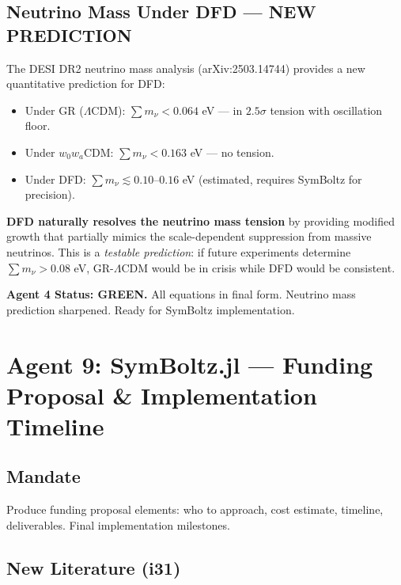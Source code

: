 \documentclass[11pt,a4paper]{article}
\newcommand{\GREEN}{\textcolor{dfdgreen}{\textbf{GREEN}}}
\begin{document}
\subsection{Neutrino Mass Under DFD --- NEW PREDICTION}

The DESI DR2 neutrino mass analysis (arXiv:2503.14744) provides a new quantitative prediction for DFD:

\begin{itemize}
\item Under GR ($\Lambda$CDM): $\sum m_\nu < 0.064$ eV --- in $2.5\sigma$ tension with oscillation floor.
\item Under $w_0w_a$CDM: $\sum m_\nu < 0.163$ eV --- no tension.
\item Under DFD: $\sum m_\nu \lesssim 0.10$--$0.16$ eV (estimated, requires SymBoltz for precision).
\end{itemize}

\textbf{DFD naturally resolves the neutrino mass tension} by providing modified growth that partially mimics the scale-dependent suppression from massive neutrinos. This is a \emph{testable prediction}: if future experiments determine $\sum m_\nu > 0.08$ eV, GR-$\Lambda$CDM would be in crisis while DFD would be consistent.

\textbf{Agent 4 Status: \GREEN.} All equations in final form. Neutrino mass prediction sharpened. Ready for SymBoltz implementation.

\section{Agent 9: SymBoltz.jl --- Funding Proposal \& Implementation Timeline}

\subsection{Mandate}
Produce funding proposal elements: who to approach, cost estimate, timeline, deliverables. Final implementation milestones.

\subsection{New Literature (i31)}
\end{document}
